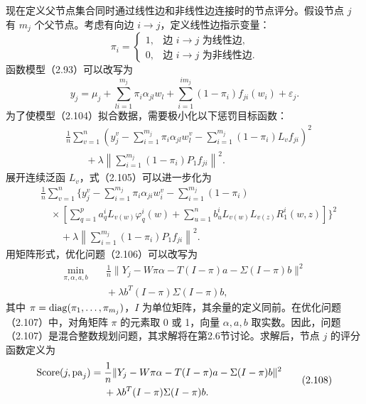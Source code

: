 现在定义父节点集合同时通过线性边和非线性边连接时的节点评分。假设节点 $j$ 有 $m_j$ 个父节点。考虑有向边 $i\to j$，定义线性边指示变量：
\begin{equation}
\pi_i=
\begin{cases}
1,&\text{边 }i\to j\text{ 为线性边},\\
0,&\text{边 }i\to j\text{ 为非线性边}.
\end{cases}
\tag{2.103}
\end{equation}
函数模型（2.93）可以改写为
\begin{equation}
y_j=\mu_j+\sum_{li=1}^{m_j}\pi_i\alpha_{jl}w_l
+\sum_{i=1}^{im_j}(1-\pi_i)f_{ji}(w_i)+\varepsilon_j.
\tag{2.104}
\end{equation}
为了使模型（2.104）拟合数据，需要极小化以下惩罚目标函数：
\begin{equation}
\begin{aligned}
&\frac1n\sum_{v=1}^{n}
\left(y_j^v-\sum_{i=1}^{m_j}\pi_i\alpha_{jl}w_l^v
-\sum_{i=1}^{m_j}(1-\pi_i)L_vf_{ji}\right)^2\\
&\qquad+\lambda\left\lVert\sum_{i=1}^{m_j}(1-\pi_i)P_1f_{ji}\right\rVert^2.
\end{aligned}\tag{2.105}
\end{equation}
展开连续泛函 $L_v$，式（2.105）可以进一步化为
\begin{equation}
\begin{aligned}
&\frac1n\sum_{v=1}^{n}\Biggl\{
y_j^v-\sum_{i=1}^{m_j}\pi_i\alpha_{ji}w_i^v
-\sum_{i=1}^{m_j}(1-\pi_i)\\
&\quad{}\times\left[
\sum_{q=1}^{p}a_q^iL_{v(w)}\varphi_q^i(w)
+\sum_{u=1}^{n}b_u^iL_{v(w)}L_{v(z)}R_1^i(w,z)
\right]\Biggr\}^2\\
&\qquad+\lambda\left\lVert\sum_{i=1}^{m_j}(1-\pi_i)P_1f_{ji}\right\rVert^2.
\end{aligned}\tag{2.106}
\end{equation}
用矩阵形式，优化问题（2.106）可以改写为
\begin{equation}
\begin{aligned}
\min_{\pi,\alpha,a,b}\quad&
\frac1n\lVert Y_j-W\pi\alpha-T(I-\pi)a-\Sigma(I-\pi)b\rVert^2\\
&{}+\lambda b^T(I-\pi)\Sigma(I-\pi)b,
\end{aligned}\tag{2.107}
\end{equation}
其中 $\pi=\operatorname{diag}(\pi_1,\ldots,\pi_{m_j})$，$I$ 为单位矩阵，其余量的定义同前。在优化问题（2.107）中，对角矩阵 $\pi$ 的元素取 0 或 1，向量 $\alpha,a,b$ 取实数。因此，问题（2.107）是混合整数规划问题，其求解将在第2.6节讨论。求解后，节点 $j$ 的评分函数定义为
\begin{equation}
\begin{aligned}
\operatorname{Score}(j,\mathrm{pa}_j)
={}&\frac1n\lVert Y_j-W\pi\alpha-T(I-\pi)a-\Sigma(I-\pi)b\rVert^2\\
&{}+\lambda b^T(I-\pi)\Sigma(I-\pi)b.
\end{aligned}\tag{2.108}
\end{equation}

